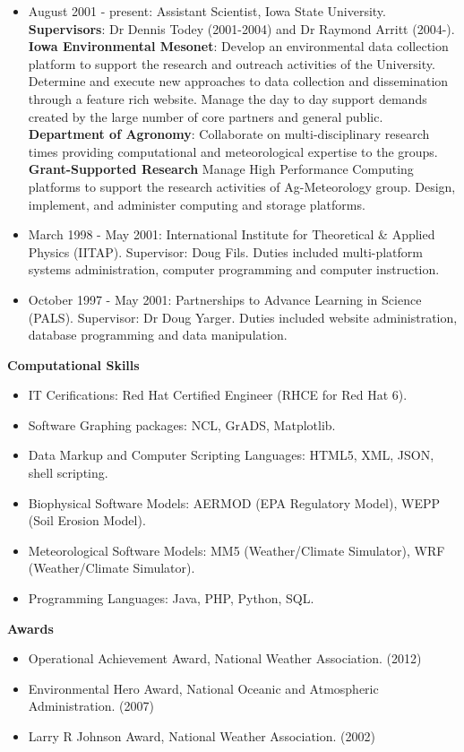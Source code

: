 \begin{itemize}
\item August 2001 - present: Assistant Scientist, Iowa State University.\\
 \textbf{Supervisors}: Dr Dennis Todey (2001-2004) and Dr Raymond Arritt (2004-).  \\
\textbf{Iowa Environmental Mesonet}: Develop an environmental data collection
platform to support the research and outreach activities of the University.
Determine and execute new approaches to data collection and dissemination 
through a feature rich website.  Manage the day to day support demands 
created by the large number of core partners and general public. \\
\textbf{Department of Agronomy}: Collaborate on multi-disciplinary research
times providing computational and meteorological expertise to the groups. \\
\textbf{Grant-Supported Research} Manage High Performance Computing platforms
to support the research activities of Ag-Meteorology group.  Design, 
implement, and administer computing and storage platforms.
\item March 1998 - May 2001: International Institute for Theoretical \& Applied 
Physics (IITAP).  Supervisor: Doug Fils. Duties included multi-platform 
systems administration, computer programming and computer instruction.
\item October 1997 - May 2001: Partnerships to Advance Learning in Science
(PALS).  Supervisor: Dr Doug Yarger.  Duties included website administration,
database programming and data manipulation.
\end{itemize}
%
\Large \bf Computational Skills
\normalsize \sf
\begin{itemize}
\item IT Cerifications: Red Hat Certified Engineer (RHCE for Red Hat 6).
\item Software Graphing packages: NCL, GrADS, Matplotlib.
\item Data Markup and Computer Scripting Languages: HTML5, XML, JSON, shell scripting.
\item Biophysical Software Models: AERMOD (EPA Regulatory Model), WEPP (Soil Erosion Model).
\item Meteorological Software Models: MM5 (Weather/Climate Simulator), WRF (Weather/Climate Simulator).
\item Programming Languages: Java, PHP, Python, SQL.
\end{itemize} 
%
\normalsize \sf
\Large \bf Awards
\normalsize \sf
\begin{itemize}
\item Operational Achievement Award, National Weather Association. (2012)
\item Environmental Hero Award, National Oceanic and Atmospheric Administration. (2007)
\item Larry R Johnson Award, National Weather Association. (2002)
\end{itemize}



